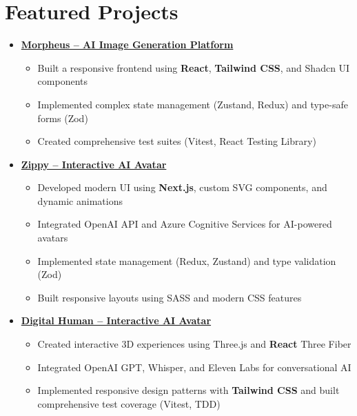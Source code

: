 \documentclass[letterpaper,11pt]{article}
\newcommand{\normalfaExternalLink}{{\mdseries\faExternalLink}}
\begin{document}
\section{Featured Projects}
\begin{itemize}[leftmargin=*]
    \item \textbf{\href{https://github.com/Monadical-SAS/Morpheus}{Morpheus -- AI Image Generation Platform \normalfaExternalLink}}
    \begin{itemize}
        \item Built a responsive frontend using \textbf{React}, \textbf{Tailwind CSS}, and Shadcn UI components
        \item Implemented complex state management (Zustand, Redux) and type-safe forms (Zod)
        \item Created comprehensive test suites (Vitest, React Testing Library)
    \end{itemize}
    
    \item \textbf{\href{https://github.com/asanchezyali/ai-avatar}{Zippy -- Interactive AI Avatar \normalfaExternalLink}}
    \begin{itemize}
        \item Developed modern UI using \textbf{Next.js}, custom SVG components, and dynamic animations
        \item Integrated OpenAI API and Azure Cognitive Services for AI-powered avatars
        \item Implemented state management (Redux, Zustand) and type validation (Zod)
        \item Built responsive layouts using SASS and modern CSS features
    \end{itemize}

    \item \textbf{\href{https://github.com/asanchezyali/talking-avatar-with-ai}{Digital Human -- Interactive AI Avatar \normalfaExternalLink}}
    \begin{itemize}
        \item Created interactive 3D experiences using Three.js and \textbf{React} Three Fiber
        \item Integrated OpenAI GPT, Whisper, and Eleven Labs for conversational AI
        \item Implemented responsive design patterns with \textbf{Tailwind CSS} and built comprehensive test coverage (Vitest, TDD)
    \end{itemize}
\end{itemize}
\end{document}
